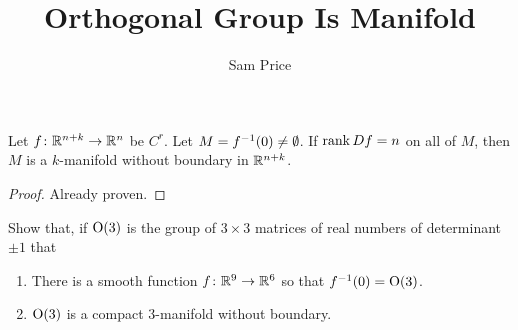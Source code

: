 \documentclass{article}
\author{Sam Price}
\title{Orthogonal Group Is Manifold}
\begin{document}
\maketitle

\begin{theorem}{}{}
  Let $f \from \RR[n + k] \to \RR[n]$ be $C^{r}$.
  Let $M = f\inv(0) \ne \emptyset$.
  If $\rank Df = n$ on all of $M$, then $M$ is a $k$-manifold without boundary in $\RR[n + k]$.
\end{theorem}
\begin{proof}
  Already proven.
\end{proof}


\begin{theorem}{}{}
  Show that, if $\Orth(3)$ is the group of $3 \times 3$ matrices of real numbers of determinant $\pm 1$ that
  \begin{enumerate}[start=1,label={\arabic*\rparen}]
    \item There is a smooth function $f \from \RR[9] \to \RR[6]$ so that $f\inv(0) = \Orth(3)$.
    \item $\Orth(3)$ is a compact 3-manifold without boundary.
  \end{enumerate}
\end{theorem}
\end{document}

